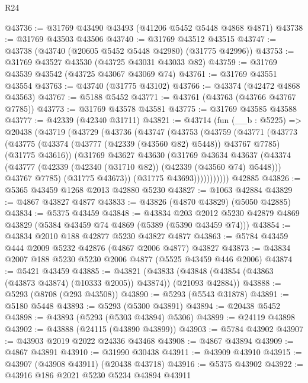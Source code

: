 \begin{lexlean}{R24}
\begin{coremodule}
@43736 := @31769 @43490 @43493 (@41206 @5452 @5448 @4868 @4871)
@43738 := @31769 @43503 @43506
@43740 := @31769 @43512 @43515
@43747 := @43738 (@43740 (@20605 @5452 @5448 @42980) (@31775 @42996))
@43753 := @31769 @43527 @43530 (@43725 @43031 @43033 @82)
@43759 := @31769 @43539 @43542 (@43725 @43067 @43069 @74)
@43761 := @31769 @43551 @43554
@43763 := @43740 (@31775 @43102)
@43766 := @43374 (@42472 @4868 @43563)
@43767 := @5188 @5452
@43771 := @43761 (@43763 (@43766 @43767 @7785))
@43773 := @31769 @43578 @43581
@43775 := @31769 @43585 @43588
@43777 := @42339 (@42340 @31711)
@43821 := @43714
    (fun (__b : @5225) =>
    @20438
      (@43719
        (@43729
          (@43736
            (@43747
              (@43753
                (@43759
                  (@43771
                    (@43773
                      (@43775
                        (@43374 (@43777 (@42339 (@43560 @82) @5448)) @43767 @7785)
                        (@31775 @43616))
                      (@31769
                        @43627
                        @43630
                        (@31769
                          @43634
                          @43637
                          (@43374
                            (@43777 (@42339 (@42340 (@31710 @82)) (@42339 (@43560 @74) @5448)))
                            @43767
                            @7785)
                          (@31775 @43673))
                        (@31775 @43693)))))))))))
    @42885
@43826 := @5365 @43459 @1268 @2013 @42880 @5230
@43827 := @1063 @42884
@43829 := @4867 @43827 @4877
@43833 := @43826 (@4870 @43829) (@5050 @42885)
@43834 := @5375 @43459
@43848 := @43834
    @203
    @2012
    @5230
    @42879
    @4869
    @43829
    (@5384 @43459 @74 @4869 (@5389 (@5390 @43459 @74)))
@43854 := @43834 @2010 @188 @42877 @5230 @43827 @4877
@43863 := @5784 @43459 @444 @2009 @5232 @42876 (@4867 @2006 @4877) @43827
@43873 := @43834 @2007 @188 @5230 @5230 @2006 @4877 (@5525 @43459 @446 @2006)
@43874 := @5421 @43459
@43885 := @43821
    (@43833 (@43848 (@43854 (@43863 (@43873 @43874) (@10333 @2005)) @43874)) (@21093 @42884))
@43888 := @5293 (@8708 (@293 @43508))
@43890 := @5293 (@5543 @31878)
@43891 := @5180 @5448
@43893 := @5293 (@5300 @43891)
@43894 := @20438 @5452
@43898 := @43893 (@5293 (@5303 @43894) @5306)
@43899 := @24119 @43898
@43902 := @43888 (@24115 (@43890 @43899))
@43903 := @5784 @43902
@43907 := @43903 @2019 @2022 @24336 @43468
@43908 := @4867 @43894
@43909 := @4867 @43891
@43910 := @31990 @30438
@43911 := @43909 @43910
@43915 := @43907 (@43908 @43911) (@20438 @43718)
@43916 := @5375 @43902
@43922 := @43916 @186 @2021 @5230 @5234 @43894 @43911

\end{coremodule}
\end{lexlean}
